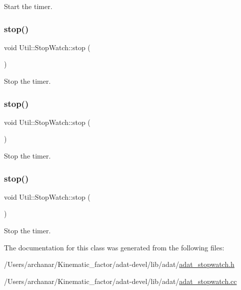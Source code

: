 Start the timer. 

\mbox{\label{classUtil_1_1StopWatch_a8a89a1d02ece7c671ee1d9e9f42c88b2}} 
\subsubsection{\texorpdfstring{stop()}{stop()}\hspace{0.1cm}{\footnotesize\ttfamily [1/3]}}
{\footnotesize\ttfamily void Util\+::\+Stop\+Watch\+::stop (\begin{DoxyParamCaption}{ }\end{DoxyParamCaption})}



Stop the timer. 

\mbox{\label{classUtil_1_1StopWatch_a8a89a1d02ece7c671ee1d9e9f42c88b2}} 
\subsubsection{\texorpdfstring{stop()}{stop()}\hspace{0.1cm}{\footnotesize\ttfamily [2/3]}}
{\footnotesize\ttfamily void Util\+::\+Stop\+Watch\+::stop (\begin{DoxyParamCaption}{ }\end{DoxyParamCaption})}



Stop the timer. 

\mbox{\label{classUtil_1_1StopWatch_a8a89a1d02ece7c671ee1d9e9f42c88b2}} 
\subsubsection{\texorpdfstring{stop()}{stop()}\hspace{0.1cm}{\footnotesize\ttfamily [3/3]}}
{\footnotesize\ttfamily void Util\+::\+Stop\+Watch\+::stop (\begin{DoxyParamCaption}{ }\end{DoxyParamCaption})}



Stop the timer. 



The documentation for this class was generated from the following files\+:\begin{DoxyCompactItemize}
\item 
/\+Users/archanar/\+Kinematic\+\_\+factor/adat-\/devel/lib/adat/\mbox{\hyperlink{adat-devel_2lib_2adat_2adat__stopwatch_8h}{adat\+\_\+stopwatch.\+h}}\item 
/\+Users/archanar/\+Kinematic\+\_\+factor/adat-\/devel/lib/adat/\mbox{\hyperlink{adat-devel_2lib_2adat_2adat__stopwatch_8cc}{adat\+\_\+stopwatch.\+cc}}\end{DoxyCompactItemize}
